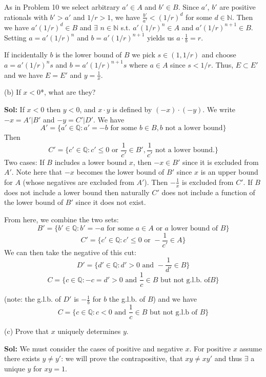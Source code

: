 \documentclass{amsart}
\begin{document}
\medskip
\noindent As in Problem 10 we select arbitrary $a'\in A$ and $b'\in B$. Since
$a'$, $b'$ are positive rationals with $b'>a'$ and $1/r > 1$, we have $\frac{b'}{a'}< (1/r)^d$ for some $d\in\mathbb{N}$. Then we have 
$a'(1/r)^d\in B$ and $\exists$ $n\in\mathbb{N}$ s.t. $a'(1/r)^n\in A$ and $a'(1/r)^{n+1}\in B$. Setting $a=a'(1/r)^n$ and $b= a'(1/r)^{n+1}$
yields us $a\cdot\frac{1}{b}=r$. 

\medskip
\noindent If incidentally $b$ is the lower bound of $B$ we pick $s\in (1, 1/r)$ and choose $a=a'(1/r)^ns$ and 
$b=a'(1/r)^{n+1}s$ where $a\in A$ since $s<1/r$. Thus, $E\subset E'$ and we have $E=E'$ and $y = \frac{1}{x}$. 

\bigskip

\indent (b) If $x<0$*, what are they?

\medskip
\noindent \textbf{Sol:} If $x<0$ then $y<0$, and $x\cdot y$ is defined by $(-x) \cdot (-y)$. We write $-x = A'|B'$ and $-y = C'|D'$. We have 
$$A' = \{a'\in\mathbb{Q} : a' = -b \text{ for some }b \in B, b \text{ not a lower bound}\}$$
Then $$C'= \{c'\in\mathbb{Q} : c'\leq 0\text{ or }\frac{1}{c'}\in B', \frac{1}{c'} \text{ not a lower bound.}\}$$ 
Two cases: If $B$ includes a lower bound $x$, then $-x\in B'$ since it is excluded from $A'$. Note here that $-x$ becomes the lower bound
of $B'$ since $x$ is an upper bound for $A$ (whose negatives are excluded from $A'$). Then $-\frac{1}{x}$ is excluded from $C'$. If $B$ does not
include a lower bound then naturally $C'$ does not include a function of the lower bound of $B'$ since it does not exist. 

\medskip
\noindent From here, we combine the two sets: $$B'=\{b'\in\mathbb{Q}: b'=-a \text{ for some }a \in A \text{ or }a \text{ lower bound of }B\}$$ 
$$C'=\{c'\in\mathbb{Q}: c'\leq 0\text{ or }-\frac{1}{c'}\in A\}$$
We can then take the negative of this cut: 
$$D'=\{d'\in\mathbb{Q}: d'>0\text{ and }-\frac{1}{d'}\in B\}$$
$$C=\{c\in\mathbb{Q}: -c=d'>0\text{ and }\frac{1}{c}\in B \text{ but not g.l.b. of} B\}$$

(note: the g.l.b. of $D'$ is $-\frac{1}{b}$ for $b$ the g.l.b. of $B$)
and we have $$C =\{c\in\mathbb{Q}: c<0\text{ and }\frac{1}{c}\in B \text{ but not g.l.b of } B\}$$


\bigskip

\indent (c) Prove that $x$ uniquely determines $y$.

\medskip
\noindent \textbf{Sol:} We must consider the cases of positive and negative $x$. For positive $x$ assume there exists $y\neq y'$: we will prove the contrapositive,
that $xy \neq xy'$ and thus $\exists$ a unique $y$ for $xy = 1$. 
\end{document}
